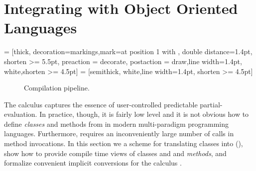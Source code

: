 
\section{Integrating \calculus with Object Oriented Languages}
\label{sct:scala-translation}
\usetikzlibrary{arrows, decorations.markings}
 = [thick, decoration={markings,mark=at position
   1 with {}},
   double distance=1.4pt, shorten >= 5.5pt,
   preaction = {decorate},
   postaction = {draw,line width=1.4pt, white,shorten >= 4.5pt}]
 = [semithick, white,line width=1.4pt, shorten >= 4.5pt]

\begin{figure}
\center
{}
\caption{Compilation pipeline.}
\label{fig:phases}
\end{figure}


The \calculus calculus  captures the essence of user-controlled
 predictable partial-evaluation. In practice, though, it is fairly low level and
 it is not obvious how to define \emph{classes} and methods from in modern multi-paradigm
 programming languages. Furthermore, \calculus requires an inconveniently
 large number of  calls in method invocations.
 In this section we a scheme for translating classes into \calculus (),
 show how to provide compile time views of classes and and \emph{methods},
 and formalize convenient implicit conversions for the calculus .

